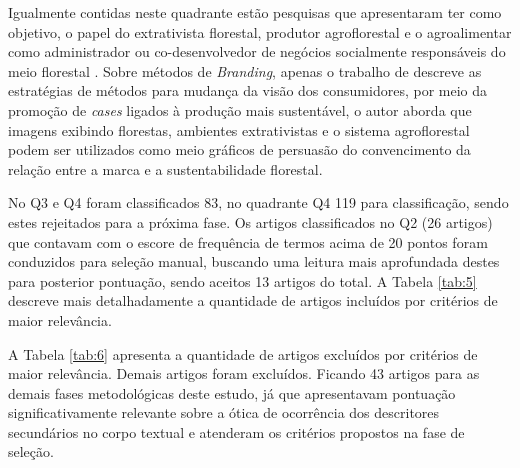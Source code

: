 Igualmente contidas neste quadrante estão pesquisas que apresentaram ter como objetivo, o papel do extrativista florestal, produtor agroflorestal e o agroalimentar como administrador ou co-desenvolvedor de negócios socialmente responsáveis do meio florestal \cite{Clercx2013TowardsApproach}. Sobre métodos de \textit{Branding}, apenas o trabalho de  descreve as estratégias de métodos para mudança da visão dos consumidores, por meio da promoção de \textit{cases} ligados à produção mais sustentável, o autor aborda que imagens exibindo florestas, ambientes extrativistas e o sistema agroflorestal podem ser utilizados como meio gráficos de persuasão do convencimento da relação entre a marca e a sustentabilidade florestal.

No Q3 e Q4 foram classificados 83, no quadrante Q4 119 para classificação, sendo estes rejeitados para a próxima fase. Os artigos classificados no Q2 (26 artigos) que contavam com o escore de frequência de termos acima de 20 pontos foram conduzidos para seleção manual, buscando uma leitura mais aprofundada destes para posterior pontuação, sendo aceitos 13 artigos do total. A Tabela \ref{tab:5} descreve mais detalhadamente a quantidade de artigos incluídos por critérios de maior relevância.


\begin{table}[H]
\centering
\caption{Quantidade de artigos incluídos por critérios de seleção}
\label{tab:5}
\end{table}

A Tabela \ref{tab:6} apresenta a quantidade de artigos excluídos por critérios de maior relevância. Demais artigos foram excluídos. Ficando 43 artigos para as demais fases metodológicas deste estudo, já que apresentavam pontuação significativamente relevante sobre a ótica de ocorrência dos descritores secundários no corpo textual e atenderam os critérios propostos na fase de seleção.



